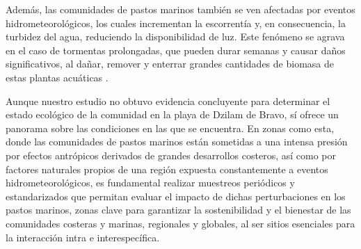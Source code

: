 \documentclass[
  authoryear,
  preprint,
  3p,
  twocolumn]{elsarticle}
\begin{document}
Además, las comunidades de pastos marinos también se ven afectadas por
eventos hidrometeorológicos, los cuales incrementan la escorrentía y, en
consecuencia, la turbidez del agua, reduciendo la disponibilidad de luz.
Este fenómeno se agrava en el caso de tormentas prolongadas, que pueden
durar semanas y causar daños significativos, al dañar, remover y
enterrar grandes cantidades de biomasa de estas plantas acuáticas
\citep{Herrera-Silveira2019}.

Aunque nuestro estudio no obtuvo evidencia concluyente para determinar
el estado ecológico de la comunidad en la playa de Dzilam de Bravo, sí
ofrece un panorama sobre las condiciones en las que se encuentra. En
zonas como esta, donde las comunidades de pastos marinos están sometidas
a una intensa presión por efectos antrópicos derivados de grandes
desarrollos costeros, así como por factores naturales propios de una
región expuesta constantemente a eventos hidrometeorológicos, es
fundamental realizar muestreos periódicos y estandarizados que permitan
evaluar el impacto de dichas perturbaciones en los pastos marinos, zonas
clave para garantizar la sostenibilidad y el bienestar de las
comunidades costeras y marinas, regionales y globales, al ser sitios
esenciales para la interacción intra e interespecífica.


\renewcommand\refname{Referencias}
  
\end{document}
